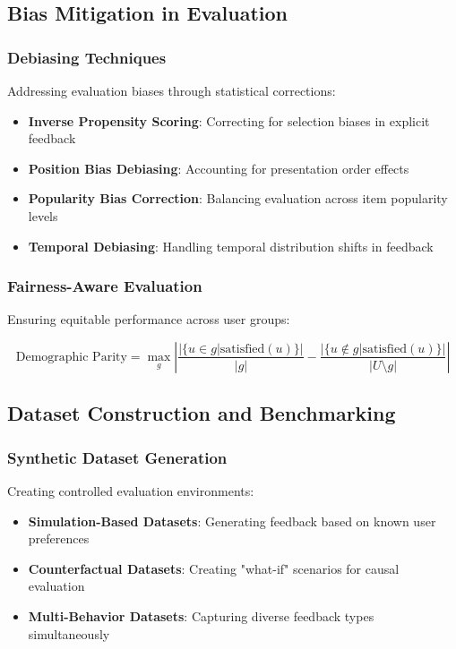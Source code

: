 \subsection{Bias Mitigation in Evaluation}

\subsubsection{Debiasing Techniques}

Addressing evaluation biases through statistical corrections:

\begin{itemize}
    \item \textbf{Inverse Propensity Scoring}: Correcting for selection biases in explicit feedback
    \item \textbf{Position Bias Debiasing}: Accounting for presentation order effects
    \item \textbf{Popularity Bias Correction}: Balancing evaluation across item popularity levels
    \item \textbf{Temporal Debiasing}: Handling temporal distribution shifts in feedback
\end{itemize}

\subsubsection{Fairness-Aware Evaluation}

Ensuring equitable performance across user groups:

\begin{equation}
\text{Demographic Parity} = \max_g \left| \frac{|\{u \in g | \text{satisfied}(u)\}|}{|g|} - \frac{|\{u \notin g | \text{satisfied}(u)\}|}{|U \setminus g|} \right|
\label{eq:demographic_parity}
\end{equation}

\subsection{Dataset Construction and Benchmarking}

\subsubsection{Synthetic Dataset Generation}

Creating controlled evaluation environments:

\begin{itemize}
    \item \textbf{Simulation-Based Datasets}: Generating feedback based on known user preferences
    \item \textbf{Counterfactual Datasets}: Creating "what-if" scenarios for causal evaluation
    \item \textbf{Multi-Behavior Datasets}: Capturing diverse feedback types simultaneously
\end{itemize}

